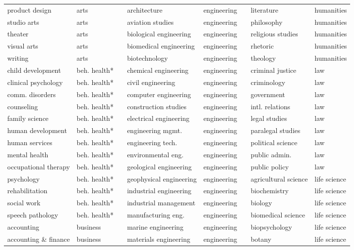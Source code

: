 \begin{table}[ht]
\begin{tabular}{ll p{0.5cm} ll p{0.5cm} ll}
product design & arts && architecture & engineering && literature & humanities \\
studio arts & arts && aviation studies & engineering && philosophy & humanities \\
theater & arts && biological engineering & engineering && religious studies & humanities \\
visual arts & arts && biomedical engineering & engineering && rhetoric & humanities \\
writing & arts && biotechnology & engineering && theology & humanities \\
child development & beh. health* && chemical engineering & engineering && criminal justice & law \\
clinical psychology & beh. health* && civil engineering & engineering && criminology & law \\
comm. disorders & beh. health* && computer engineering & engineering && government & law \\
counseling & beh. health* && construction studies & engineering && intl. relations & law \\
family science & beh. health* && electrical engineering & engineering && legal studies & law \\
human development & beh. health* && engineering mgmt. & engineering && paralegal studies & law \\
human services & beh. health* && engineering tech. & engineering && political science & law \\
mental health & beh. health* && environmental eng. & engineering && public admin. & law \\
occupational therapy & beh. health* && geological engineering & engineering && public policy & law \\
psychology & beh. health* && geophysical engineering & engineering && agricultural science & life science \\
rehabilitation & beh. health* && industrial engineering & engineering && biochemistry & life science \\
social work & beh. health* && industrial management & engineering && biology & life science \\
speech pathology & beh. health* && manufacturing eng. & engineering && biomedical science & life science \\
accounting & business && marine engineering & engineering && biopsychology & life science \\
accounting \& finance & business && materials engineering & engineering && botany & life science \\

\end{tabular}
\end{table}
